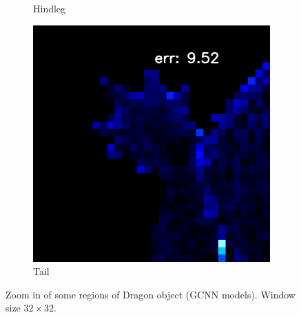 \begin{figure}[th]
\begin{subfigure}[b]{0.18\linewidth}
		\caption{Hindleg}
	\end{subfigure}
	\begin{subfigure}[b]{0.18\linewidth}
		\includegraphics[width=\linewidth]{./Figures/gcnn_synthetic/eval_7_12_-48_error.png}
		\caption{Tail}
	\end{subfigure}
	
	\decoRule
	\caption{Zoom in of some regions of Dragon object (GCNN models). Window size $ 32\times32 $.}
	\label{fig:gcnn-eval-synthetic-zoom-in}
\end{figure}


